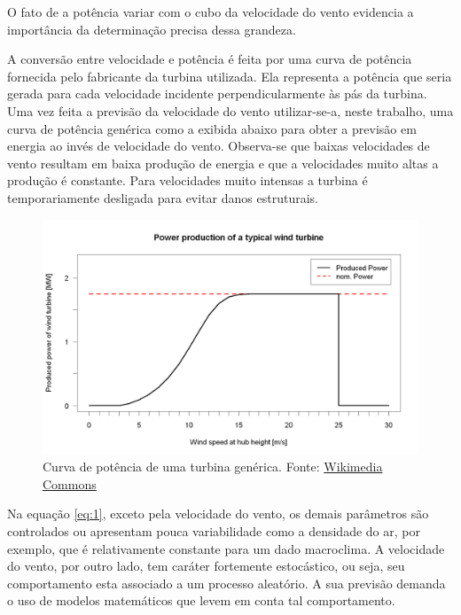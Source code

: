 \documentclass[
	12pt,				%
	openright,			%
	oneside,			%
	a4paper,			%
	english,			%
	french,				%
	spanish,			%
	brazil				%
	]{abntex2}
\begin{document}
O fato de a potência variar com o cubo da velocidade do vento evidencia a importância da determinação precisa dessa grandeza.

A conversão entre velocidade e potência é feita por uma curva de potência fornecida pelo fabricante da turbina utilizada. Ela representa a potência que seria gerada para cada velocidade incidente perpendicularmente às pás da turbina. Uma vez feita a previsão da velocidade do vento utilizar-se-a, neste trabalho, uma curva de potência genérica como a exibida abaixo para obter a previsão em energia ao invés de velocidade do vento. Observa-se que baixas velocidades de vento resultam em baixa produção de energia e que a velocidades muito altas a produção é constante. Para velocidades muito intensas a turbina é temporariamente desligada para evitar danos estruturais.


\begin{figure}[h]
    \centering
	\includegraphics[width=\textwidth]{powercurve}
	\caption{Curva de potência de uma turbina genérica. Fonte: \href{https://upload.wikimedia.org/wikipedia/commons/6/67/Powercurve.png}{Wikimedia Commons}}
\end{figure}
\FloatBarrier

Na equação \ref{eq:1}, exceto pela velocidade do vento, os demais parâmetros são controlados ou apresentam pouca variabilidade como a densidade do ar, por exemplo, que é relativamente constante para um dado macroclima. A velocidade do vento, por outro lado, tem caráter fortemente estocástico, ou seja, seu comportamento esta associado a um processo aleatório. A sua previsão demanda o uso de modelos matemáticos que levem em conta tal comportamento.
\end{document}

